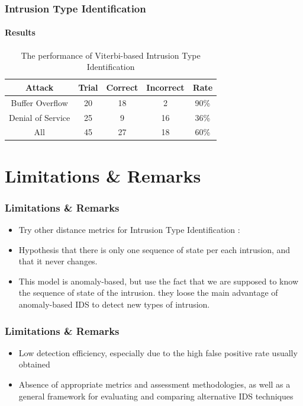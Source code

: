 \documentclass{beamer}
\begin{document}
\begin{frame}
  \frametitle{Intrusion Type Identification}
  \framesubtitle{Results}
  \begin{table}[h]
    \centering
    \caption{\label{tab:IDS}The performance of Viterbi-based Intrusion
      Type Identification}
    \begin{tabular}{|c| c|c | c | c |}
      \hline
      Attack & Trial & Correct & Incorrect & Rate \\ \hline
      Buffer Overflow & 20 & 18 & 2 & 90\% \\ \hline
      Denial of Service & 25 & 9 & 16 & 36\% \\ \hline
      All  & 45 & 27 & 18 & 60\% \\ \hline
    \end{tabular}
  \end{table}    
\end{frame}

\section{Limitations \& Remarks}
\begin{frame}
  \frametitle{Limitations \& Remarks}
  \begin{itemize}[label=$\square$]
  \item Try other distance metrics for Intrusion Type Identification :
    \pause
  \item Hypothesis that there is only one sequence of state per each intrusion, 
    and that it never changes.\pause
  \item This model is anomaly-based, but use the fact that we are supposed to 
    know the sequence of state of the intrusion. they loose the main advantage 
    of anomaly-based IDS to detect new types of intrusion.
  \end{itemize}
\end{frame}

\begin{frame}
  \frametitle{Limitations \& Remarks}
  \begin{itemize}[label=$\square$]
  \item  Low detection efficiency, especially due to the high false positive 
    rate usually obtained \pause
  \item Absence of appropriate metrics and assessment methodologies, as well as 
    a general framework for evaluating and comparing alternative IDS techniques
  \end{itemize}
\end{frame}
\end{document}
